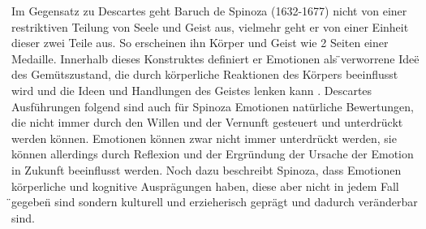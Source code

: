 Im Gegensatz zu Descartes geht Baruch de Spinoza (1632-1677) nicht von einer restriktiven Teilung von Seele und Geist aus, vielmehr geht er von einer Einheit dieser zwei Teile aus. So erscheinen ihn Körper und Geist wie 2 Seiten einer Medaille. Innerhalb dieses Konstruktes definiert er Emotionen als \"{}verworrene Idee\"{} des Gemütszustand, die durch körperliche Reaktionen des Körpers beeinflusst wird und die Ideen und Handlungen des Geistes lenken kann \cite{moreau_imitation_2006}. 
Descartes Ausführungen folgend sind auch für Spinoza Emotionen natürliche Bewertungen, die nicht immer durch den Willen und der Vernunft gesteuert und unterdrückt werden können. Emotionen können zwar nicht immer unterdrückt werden, sie können allerdings durch Reflexion und der Ergründung der Ursache der Emotion in Zukunft beeinflusst werden. Noch dazu beschreibt Spinoza, dass Emotionen körperliche und kognitive Ausprägungen haben, diese aber nicht in jedem Fall \"{}gegeben\"{} sind sondern kulturell und erzieherisch geprägt und dadurch veränderbar sind. \cite{renz_spinoza:_2008} \\


